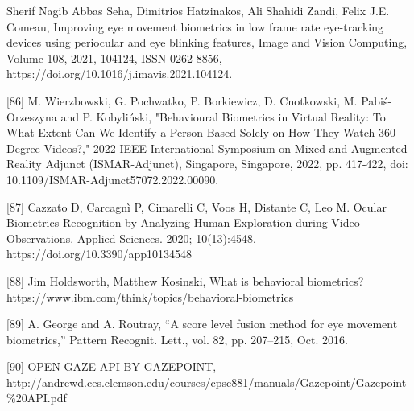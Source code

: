 \documentclass{article}
\begin{document}
\begin{raggedright}
[85] Sherif Nagib Abbas Seha, Dimitrios Hatzinakos, Ali Shahidi Zandi, Felix J.E. Comeau, Improving eye movement biometrics in low frame rate eye-tracking devices using periocular and eye blinking features, Image and Vision Computing, Volume 108, 2021, 104124, ISSN 0262-8856, https://doi.org/10.1016/j.imavis.2021.104124.

[86] M. Wierzbowski, G. Pochwatko, P. Borkiewicz, D. Cnotkowski, M. Pabiś-Orzeszyna and P. Kobyliński, "Behavioural Biometrics in Virtual Reality: To What Extent Can We Identify a Person Based Solely on How They Watch 360-Degree Videos?," 2022 IEEE International Symposium on Mixed and Augmented Reality Adjunct (ISMAR-Adjunct), Singapore, Singapore, 2022, pp. 417-422, doi: 10.1109/ISMAR-Adjunct57072.2022.00090.

[87] Cazzato D, Carcagnì P, Cimarelli C, Voos H, Distante C, Leo M. Ocular Biometrics Recognition by Analyzing Human Exploration during Video Observations. Applied Sciences. 2020; 10(13):4548. https://doi.org/10.3390/app10134548

[88] Jim Holdsworth, Matthew Kosinski, What is behavioral biometrics? https://www.ibm.com/think/topics/behavioral-biometrics

[89] A. George and A. Routray, “A score level fusion method for eye movement biometrics,” Pattern Recognit. Lett., vol. 82, pp. 207–215, Oct. 2016.

[90] OPEN GAZE API BY GAZEPOINT, http://andrewd.ces.clemson.edu/courses/cpsc881/manuals/Gazepoint/Gazepoint\%20API.pdf

\end{raggedright}
\end{document}
